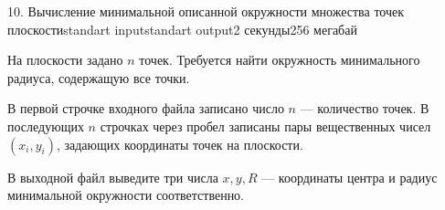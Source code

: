 \begin{problem}{10. Вычисление минимальной описанной окружности множества точек плоскости}{standart input}{standart output}{2 секунды}{256 мегабай}

На плоскости задано $n$ точек. Требуется найти окружность минимального радиуса, содержащую все точки.

\InputFile

В первой строчке входного файла записано число $n$ --- количество точек. В последующих $n$ строчках через пробел записаны пары вещественных чисел $(x_i, y_i)$, задающих координаты точек на плоскости.

\OutputFile

В выходной файл выведите три числа $x, y, R$ --- координаты центра и радиус минимальной окружности соответственно.

\Examples

\begin{example}%
%
\end{example}

\end{problem}
